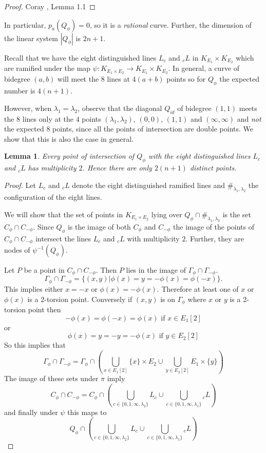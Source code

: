 \documentclass[11pt,a4paper]{article}
\newtheorem{lem}[defn]{Lemma}
\newcommand {\lb}{{\lambda}}
\newcommand {\KE}{{K_{E_1 \times E_2}}}
\begin{document}
\begin{proof} Coray \cite{cora}, Lemma 1.1 
	\end{proof}
In particular, $p_a(Q_{\phi})=0$, so it is a {\em rational} curve. Further, the dimension of the linear system $|Q_{\phi}|$ is $2n+1$. 

Recall that we have the eight distinguished lines $L_c$ and ${}_cL$ in $K_{E_1}\times K_{E_2}$ which are ramified under the map $\psi: \KE \longrightarrow K_{E_1} \times K_{E_2}$. In general, a curve of bidegree $(a,b)$ will meet the $8$ lines at $4(a+b)$ points so for $Q_{\phi}$ the expected number is $4(n+1)$.

However, when $\lambda_1=\lambda_2$, observe that the diagonal $Q_{id}$ of bidegree $(1,1)$ meets the $8$ lines only at the $4$  points $(\lb_1,\lb_2)$, $(0,0)$, $(1,1)$ and $(\infty,\infty)$ and {\em not} the expected $8$ points, since all the points of intersection are double points. We show that this is also the case in general. 


\begin{lem} Every point of intersection of $Q_{\phi}$ with the  eight distinguished lines $L_c$ and ${}_cL$ has multiplicity $2$. Hence there are only  $2(n+1)$ distinct points. 
	\label{doubleintersection} 
\end{lem}


\begin{proof}
	
	Let $L_c$ and ${}_cL$ denote the eight distinguished ramified  lines and $\#_{\lb_1,\lb_2}$ the configuration of the eight lines. 
	
	
	 We will show that the set of points in $\KE$ lying over  $Q_{\phi} \cap  \#_{\lb_1,\lb_2}$  is  the set 
	$C_{\phi}\cap C_{-\phi}$. Since $Q_{\phi}$ is the image of both $C_{\phi}$ and $C_{-\phi}$ the image of the points of $C_{\phi} \cap C_{-\phi}$ intersect the lines $L_c$ and ${}_cL$  with  multiplicity $2$. Further, they are nodes of $\psi^{-1}(Q_{\phi})$.
	
	Let $P$ be a point in $C_{\phi} \cap C_{-\phi}$. Then $P$ lies in the image of $\Gamma_{\phi} \cap \Gamma_{-\phi}$. 
	$$\Gamma_{\phi} \cap \Gamma_{-\phi}=\{(x,y)| \phi(x)=y=-\phi(x)=\phi(-x)\}.$$
	This implies either $x=-x$ or $\phi(x)=-\phi(x)$. Therefore at least one of $x$ or $\phi(x)$ is a 2-torsion point. Conversely if $(x,y)$ is on $\Gamma_{\phi}$ where $x$ or $y$ is a 2- torsion point then 
	$$-\phi(x)=\phi(-x)=\phi(x)  \text{ if } x \in E_1[2]$$
	or  
	$$\phi(x)=y=-y=-\phi(x) \text{ if }  y \in E_2[2]$$
	So this implies that 
	$$\Gamma_{\phi} \cap \Gamma_{-\phi} =\Gamma_{\phi} \cap \left( \bigcup_{x\in E_1[2]}  \{x\} \times E_2 \cup \bigcup_{y \in E_2[2]} E_1 \times \{y\}\right)$$
	The image of these sets under $\pi$ imply 
    $$C_{\phi} \cap C_{-\phi}=C_{\phi} \cap \left(\bigcup_{c \in \{0,1,\infty,\lb_2\}} L_c \cup \bigcup_{c \in \{0,1,\infty,\lb_1\}} {}_cL\right)$$
    and finally under $\psi$ this maps to 
    $$Q_{\phi} \cap \left(\bigcup_{c \in \{0,1,\infty,\lb_2\}} L_c \cup \bigcup_{c \in \{0,1,\infty,\lb_1\}} {}_cL\right)$$
	
\end{proof}
\end{document}
